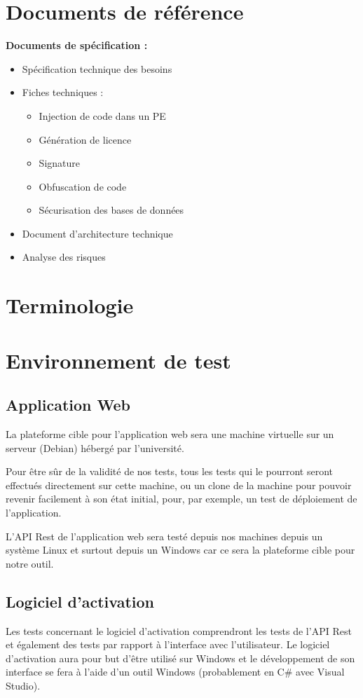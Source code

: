 \chapter{Documents de référence}
\textbf{Documents de spécification :}
\begin{itemize}
    \item Spécification technique des besoins
    \item Fiches techniques :
    \begin{itemize}
        \item Injection de code dans un PE
        \item Génération de licence
        \item Signature
        \item Obfuscation de code
        \item Sécurisation des bases de données
    \end{itemize}
    \item Document d'architecture technique
    \item Analyse des risques
\end{itemize}

\chapter{Terminologie}

\chapter{Environnement de test}

\section{Application Web}
La plateforme cible pour l'application web sera une machine virtuelle sur un serveur (Debian)
hébergé par l'université.

Pour être sûr de la validité de nos tests, tous les tests qui le pourront seront effectués
directement sur cette machine, ou un clone de la machine pour pouvoir revenir facilement à son
état initial, pour, par exemple, un test de déploiement de l'application.

L'API Rest de l'application web sera testé depuis nos machines depuis un système Linux et surtout
depuis un Windows car ce sera la plateforme cible pour notre outil.

\section{Logiciel d'activation}
Les tests concernant le logiciel d'activation comprendront les tests de l'API Rest et également
des tests par rapport à l'interface avec l'utilisateur. Le logiciel d'activation aura pour but
d'être utilisé sur Windows et le développement de son interface se fera à l'aide d'un outil Windows
(probablement en C\# avec Visual Studio).

